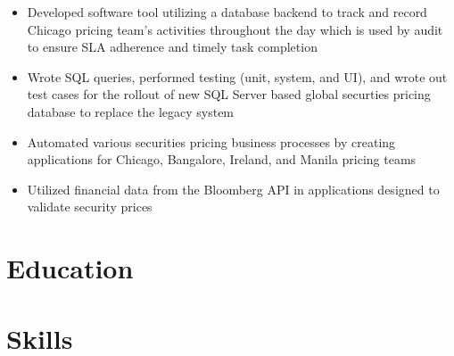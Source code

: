 \documentclass[11pt,a4paper,sans]{moderncv}
\begin{document}
		
			\vspace{5mm}
		
		\begin{itemize}
			
				\item Developed software tool utilizing a database backend to track and record Chicago pricing team's activities  throughout the day which is used by audit to ensure SLA adherence and timely task completion

			
				\item Wrote SQL queries, performed testing (unit, system, and UI), and wrote out test cases for the  rollout of new SQL Server based global securties pricing database to replace the legacy system

			
				\item Automated various securities pricing business processes by creating applications for Chicago, Bangalore,  Ireland, and Manila pricing teams

			
				\item Utilized financial data from the Bloomberg API in applications designed to validate security prices

			
		\end{itemize}
	

	\section{Education}
	
	
	

	\section{Skills}
	
	
	
	
	
	
	
	
\end{document}
